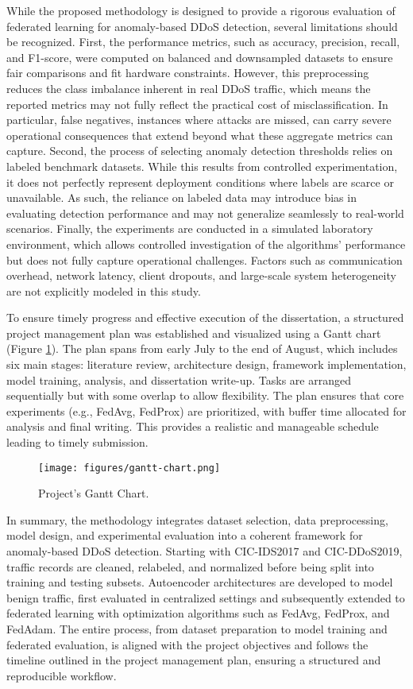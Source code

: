 While the proposed methodology is designed to provide a rigorous evaluation of federated learning for anomaly-based DDoS detection, several limitations should be recognized. First, the performance metrics, such as accuracy, precision, recall, and F1-score, were computed on balanced and downsampled datasets to ensure fair comparisons and fit hardware constraints. However, this preprocessing reduces the class imbalance inherent in real DDoS traffic, which means the reported metrics may not fully reflect the practical cost of misclassification. In particular, false negatives, instances where attacks are missed, can carry severe operational consequences that extend beyond what these aggregate metrics can capture. Second, the process of selecting anomaly detection thresholds relies on labeled benchmark datasets. While this results from controlled experimentation, it does not perfectly represent deployment conditions where labels are scarce or unavailable. As such, the reliance on labeled data may introduce bias in evaluating detection performance and may not generalize seamlessly to real-world scenarios. Finally, the experiments are conducted in a simulated laboratory environment, which allows controlled investigation of the algorithms' performance but does not fully capture operational challenges. Factors such as communication overhead, network latency, client dropouts, and large-scale system heterogeneity are not explicitly modeled in this study.

To ensure timely progress and effective execution of the dissertation, a structured project management plan was established and visualized using a Gantt chart (Figure \ref{fig:gantt_chart}). The plan spans from early July to the end of August, which includes six main stages: literature review, architecture design, framework implementation, model training, analysis, and dissertation write-up. Tasks are arranged sequentially but with some overlap to allow flexibility. The plan ensures that core experiments (e.g., FedAvg, FedProx) are prioritized, with buffer time allocated for analysis and final writing. This provides a realistic and manageable schedule leading to timely submission.

\begin{figure}[h]
    \centering
    \texttt{[image: figures/gantt-chart.png]}
    \caption{Project's Gantt Chart.}
    \label{fig:gantt_chart}
\end{figure}

In summary, the methodology integrates dataset selection, data preprocessing, model design, and experimental evaluation into a coherent framework for anomaly-based DDoS detection. Starting with CIC-IDS2017 and CIC-DDoS2019, traffic records are cleaned, relabeled, and normalized before being split into training and testing subsets. Autoencoder architectures are developed to model benign traffic, first evaluated in centralized settings and subsequently extended to federated learning with optimization algorithms such as FedAvg, FedProx, and FedAdam. The entire process, from dataset preparation to model training and federated evaluation, is aligned with the project objectives and follows the timeline outlined in the project management plan, ensuring a structured and reproducible workflow.
